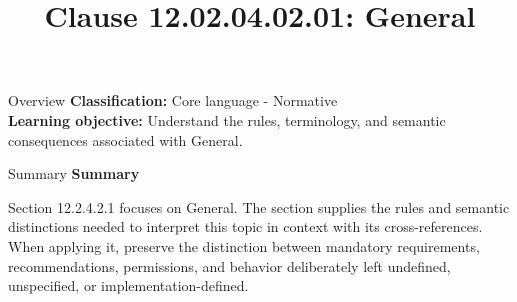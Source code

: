 \documentclass[10pt,letterpaper]{article}
\title{Clause 12.02.04.02.01: General}
\author{}
\date{}
\begin{document}
\maketitle
\begin{CornellOverviewBox}{Overview}
\textbf{Classification:} Core language - Normative\\[2pt]
\textbf{Learning objective:} Understand the rules, terminology, and semantic consequences associated with General.
\end{CornellOverviewBox}\begin{CornellSummaryBox}{Summary}
{\sffamily\bfseries\color{Accent} Summary}\par\vspace{3pt}Section 12.2.4.2.1 focuses on General. The section supplies the rules and semantic distinctions needed to interpret this topic in context with its cross-references. When applying it, preserve the distinction between mandatory requirements, recommendations, permissions, and behavior deliberately left undefined, unspecified, or implementation-defined.
\end{CornellSummaryBox}
\end{document}
